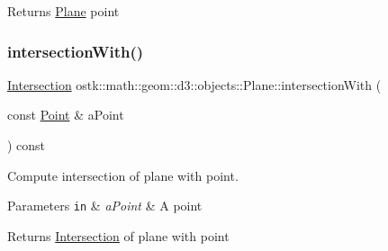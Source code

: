 \begin{DoxyReturn}{Returns}
\hyperlink{classostk_1_1math_1_1geom_1_1d3_1_1objects_1_1_plane}{Plane} point 
\end{DoxyReturn}
\mbox{\label{classostk_1_1math_1_1geom_1_1d3_1_1objects_1_1_plane_a1b0b693ea9fbe937dbaf39eda6fe86e6}} 
\subsubsection{\texorpdfstring{intersection\+With()}{intersectionWith()}\hspace{0.1cm}{\footnotesize\ttfamily [1/5]}}
{\footnotesize\ttfamily \hyperlink{classostk_1_1math_1_1geom_1_1d3_1_1_intersection}{Intersection} ostk\+::math\+::geom\+::d3\+::objects\+::\+Plane\+::intersection\+With (\begin{DoxyParamCaption}\item[{const \hyperlink{classostk_1_1math_1_1geom_1_1d3_1_1objects_1_1_point}{Point} \&}]{a\+Point }\end{DoxyParamCaption}) const}



Compute intersection of plane with point. 


\begin{DoxyParams}[1]{Parameters}
\mbox{\tt in}  & {\em a\+Point} & A point \\
\hline
\end{DoxyParams}
\begin{DoxyReturn}{Returns}
\hyperlink{classostk_1_1math_1_1geom_1_1d3_1_1_intersection}{Intersection} of plane with point 
\end{DoxyReturn}
\mbox{\label{classostk_1_1math_1_1geom_1_1d3_1_1objects_1_1_plane_a6fa36d3b2dda5f7a3e2774a4c35006b5}} 
